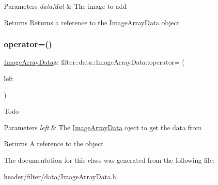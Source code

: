 \begin{DoxyParams}{Parameters}
{\em data\+Mat} & The image to add \\
\hline
\end{DoxyParams}
\begin{DoxyReturn}{Returns}
Returns a reference to the \hyperlink{classfilter_1_1data_1_1_image_array_data}{Image\+Array\+Data} object 
\end{DoxyReturn}
\mbox{\label{classfilter_1_1data_1_1_image_array_data_a6986bd7246e4468bf9afd2c2196608fc}} 
\subsubsection{\texorpdfstring{operator=()}{operator=()}}
{\footnotesize\ttfamily \hyperlink{classfilter_1_1data_1_1_image_array_data}{Image\+Array\+Data}\& filter\+::data\+::\+Image\+Array\+Data\+::operator= (\begin{DoxyParamCaption}\item[{const \hyperlink{classfilter_1_1data_1_1_image_array_data}{Image\+Array\+Data} \&}]{left }\end{DoxyParamCaption})\hspace{0.3cm}{\ttfamily [inline]}}

\begin{DoxyRefDesc}{Todo}
\item[\hyperlink{todo__todo000022}{Todo}]\end{DoxyRefDesc}

\begin{DoxyParams}{Parameters}
{\em left} & The \hyperlink{classfilter_1_1data_1_1_image_array_data}{Image\+Array\+Data} oject to get the data from \\
\hline
\end{DoxyParams}
\begin{DoxyReturn}{Returns}
A reference to the object 
\end{DoxyReturn}


The documentation for this class was generated from the following file\+:\begin{DoxyCompactItemize}
\item 
header/filter/data/Image\+Array\+Data.\+h\end{DoxyCompactItemize}
